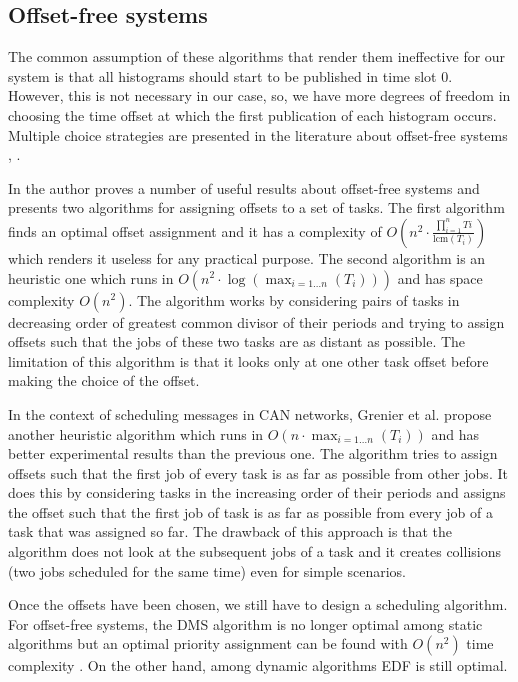 \subsection*{Offset-free systems} 
 The common assumption of these algorithms that render them ineffective for our system is that all histograms should start to be published in time slot 0. However, this is not necessary in our case, so, we have more degrees of freedom in choosing the time offset at which the first publication of each histogram occurs. Multiple choice strategies are presented in the literature about offset-free systems \citep{goossens2003scheduling}, \citep{grenier2008pushing}.
 
In \citep{goossens2003scheduling} the author proves a number of useful results about offset-free systems and presents two algorithms for assigning offsets to a set of tasks. The first algorithm finds an optimal offset assignment and it has a complexity of $O(n^2 \cdot \frac{\prod_{i=1}^n Ti}{\text{lcm}(T_i)})$ which renders it useless for any practical purpose. The second algorithm is an heuristic one which runs in $O(n^2\cdot \log(\max_{i=1\ldots n}(T_i)))$ and has space complexity $O(n^2)$. The algorithm works by considering pairs of tasks in decreasing order of greatest common divisor of their periods and trying to assign offsets such that the jobs of these two tasks are as distant as possible. The limitation of this algorithm is that it looks only at one other task offset before making the choice of the offset.

In the context of scheduling messages in CAN networks, Grenier et al. \citep{grenier2008pushing} propose another heuristic algorithm which runs in $O(n\cdot \max_{i=1 \ldots n}(T_i))$ and has better experimental results than the previous one. The algorithm tries to assign offsets such that the first job of every task is as far as possible from other jobs. It does this by considering tasks in the increasing order of their periods and assigns the offset such that the first job of task is as far as possible from every job of a task that was assigned so far. The drawback of this approach is that the algorithm does not look at the subsequent jobs of a task and it creates collisions (two jobs scheduled for the same time) even for simple scenarios.

Once the offsets have been chosen, we still have to design a scheduling algorithm. For offset-free systems, the DMS algorithm is no longer optimal among static algorithms but an optimal priority assignment can be found with $O(n^2)$ time complexity \citep{audsley2001priority}. On the other hand, among dynamic algorithms EDF is still optimal. 

